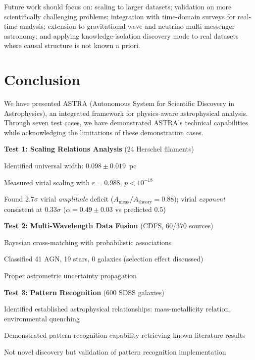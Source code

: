 \documentclass[usenatbib]{rasti}
\begin{document}
Future work should focus on: scaling to larger datasets; validation on more scientifically challenging problems; integration with time-domain surveys for real-time analysis; extension to gravitational wave and neutrino multi-messenger astronomy; and applying knowledge-isolation discovery mode to real datasets where causal structure is not known a priori.

\section{Conclusion}

We have presented ASTRA (Autonomous System for Scientific Discovery in Astrophysics), an integrated framework for physics-aware astrophysical analysis. Through seven test cases, we have demonstrated ASTRA's technical capabilities while acknowledging the limitations of these demonstration cases.

\textbf{Test 1: Scaling Relations Analysis} (24 Herschel filaments)
\begin{description}
\item Identified universal width: $0.098 \pm 0.019$~pc
\item Measured virial scaling with $r = 0.988$, $p < 10^{-18}$
\item Found 2.7$\sigma$ virial \emph{amplitude} deficit ($A_{\mathrm{meas}}/A_{\mathrm{theory}} = 0.88$); virial \emph{exponent} consistent at $0.33\sigma$ ($\alpha = 0.49 \pm 0.03$ vs predicted $0.5$)
\end{description}

\textbf{Test 2: Multi-Wavelength Data Fusion} (CDFS, 60/370 sources)
\begin{description}
\item Bayesian cross-matching with probabilistic associations
\item Classified 41 AGN, 19 stars, 0 galaxies (selection effect discussed)
\item Proper astrometric uncertainty propagation
\end{description}

\textbf{Test 3: Pattern Recognition} (600 SDSS galaxies)
\begin{description}
\item Identified established astrophysical relationships: mass-metallicity relation, environmental quenching
\item Demonstrated pattern recognition capability retrieving known literature results
\item Not novel discovery but validation of pattern recognition implementation
\end{description}
\end{document}
